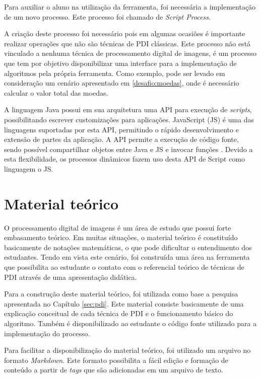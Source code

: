 \documentclass[
	12pt,				%
	oneside,			%
	a4paper,			%
	english,			%
	french,				%
	spanish,			%
	brazil,				%
	]{abntex2}
\begin{document}
Para auxiliar o aluno na utilização da ferramenta, foi necessária a implementação de um novo processo. Este processo foi chamado de \textit{Script Process}.

A criação deste processo foi necessário pois em algumas ocasiões é importante realizar operações que não são técnicas de PDI clássicas. Este processo não está vinculado a nenhuma técnica de processamento digital de imagens, é um processo que tem por objetivo disponibilizar uma interface para a implementação de algoritmos pela própria ferramenta. Como exemplo, pode ser levado em consideração um cenário apresentado em \ref{desafio:moedas}, onde é necessário calcular o valor total das moedas.

A linguagem Java possui em sua arquitetura uma API para execução de \textit{scripts}, possibilitando escrever customizações para aplicações. JavaScript (JS) é uma das linguagens suportadas por esta API, permitindo o rápido desenvolvimento e extensão de partes da aplicação. A API permite a execução de código fonte, sendo possível compartilhar objetos entre Java e JS e invocar funções \cite{oracle}. Devido a esta flexibilidade, os processos dinâmicos fazem uso desta API de Script como linguagem o JS. 

\section{Material teórico}
\label{sec:materialTeorico}

O processamento digital de imagens é um área de estudo que possui forte embasamento teórico. Em muitas situações, o material teórico é constituído basicamente de notações matemáticas, o que pode dificultar o entendimento dos estudantes. Tendo em vista este cenário, foi construída uma área na ferramenta que possibilita ao estudante o contato com o referencial teórico de técnicas de PDI através de uma apresentação didática.

Para a construção deste material teórico, foi utilizada como base a pesquisa apresentada no Capítulo \ref{sec:pdi}. Este material consiste basicamente de uma explicação conceitual de cada técnica de PDI e o funcionamento básico do algoritmo. Também é disponibilizado ao estudante o código fonte utilizado para a implementação do processo.

Para facilitar a disponibilização do material teórico, foi utilizado um arquivo no formato \textit{Markdown}. Este formato possibilita a fácil edição e formação de conteúdo a partir de \textit{tags} que são adicionadas em um arquivo de texto.
\end{document}
